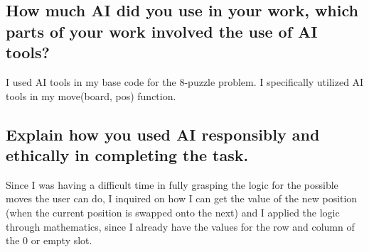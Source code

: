 \documentclass[journal]{./IEEE/IEEEtran}
\begin{document}
\subsection{How much AI did you use in your work, which parts of your work involved the use of AI tools?}
I used AI tools in my base code for the 8-puzzle problem. I specifically utilized AI tools in my move(board, pos) function.

\subsection{Explain how you used AI responsibly and ethically in completing the task.}
Since I was having a difficult time in fully grasping the logic for the possible moves the user can do, 
I inquired on how I can get the value of the new position (when the current position is swapped onto the next) 
and I applied the logic through mathematics, since I already have the values for the row and column of the 0 or 
empty slot.
\end{document}
